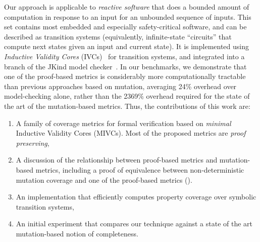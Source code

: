 Our approach is applicable to {\em reactive software} that does a bounded amount of computation in response to an input for an unbounded sequence of inputs.  This set contains most embedded and especially safety-critical software, and can be described as transition systems (equivalently, infinite-state ``circuits'' that compute next states given an input and current state).
It is implemented using {\em Inductive Validity Cores} (IVCs)~\cite{Ghass16} for transition systems, and integrated into a branch of the JKind model checker~\cite{jkind}.  In our benchmarks, we demonstrate that one of the proof-based metrics is considerably more computationally tractable than previous approaches based on mutation, averaging 24\% overhead over model-checking alone, rather than the 2369\% overhead required for the state of the art of the mutation-based metrics.
Thus, the contributions of this work are:
\begin{enumerate}
\item A family of coverage metrics for formal verification based on \emph{minimal} Inductive Validity Cores (MIVCs).  Most of the proposed metrics are {\em proof preserving},
\item A discussion of the relationship between proof-based metrics and mutation-based metrics, including a proof of equivalence between non-deterministic mutation coverage and one of the proof-based metrics (\mustcov).
\item An implementation that efficiently computes property coverage over symbolic transition systems,
\item An initial experiment that compares our technique against a state of the art mutation-based notion of completeness.
\end{enumerate}


\iffalse
The rest of the paper is organized as follows.  In Section~\ref{sec:example}, we present a running example to illustrate the concepts formalized throughout the paper.  In Section~\ref{sec:background}, we provide the formal preliminaries for the approach and some background on mutation-based coverage notions.  Section~\ref{sec:method} presents proof-based coverage metrics.
Section~\ref{sec:illust} illustrates the assessment of requirements completeness with the new metrics. Section~\ref{sec:impl} provides detail on implementation. Section~\ref{sec:experiments} describes an experiment to evaluate our algorithm.
Section~\ref{sec:discussion} provides a discussion.  In Section~\ref{sec:related}, we cover related work.  Finally, Section~\ref{sec:conclusion} mentions some conclusions.
\fi
